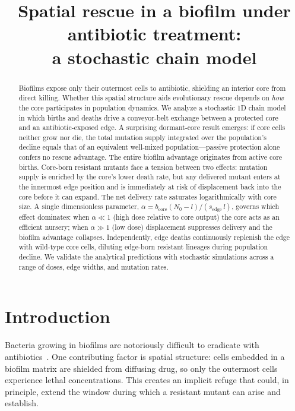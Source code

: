 \documentclass[12pt]{article}
\title{Spatial rescue in a biofilm under antibiotic treatment:\\
a stochastic chain model}
\author{}
\date{}
\begin{document}
\maketitle

\begin{abstract}
Biofilms expose only their outermost cells to antibiotic, shielding an interior
core from direct killing. Whether this spatial structure aids evolutionary
rescue depends on \emph{how} the core participates in population dynamics.
We analyze a stochastic 1D chain model in which births and deaths drive a
conveyor-belt exchange between a protected core and an antibiotic-exposed edge.
A surprising dormant-core result emerges: if core cells neither grow nor die,
the total mutation supply integrated over the population's decline equals that
of an equivalent well-mixed population---passive protection alone confers no
rescue advantage. The entire biofilm advantage originates from active core
births. Core-born resistant mutants face a tension between two effects:
mutation supply is enriched by the core's lower death rate, but any delivered
mutant enters at the innermost edge position and is immediately at risk of
displacement back into the core before it can expand. The net delivery rate
saturates logarithmically with core size. A single dimensionless parameter,
$\alpha = b_{\mathrm{core}}(N_0 - l)/(s_{\mathrm{edge}}\,l)$, governs which
effect dominates: when $\alpha \ll 1$ (high dose relative to core output) the
core acts as an efficient nursery; when $\alpha \gg 1$ (low dose) displacement
suppresses delivery and the biofilm advantage collapses. Independently, edge
deaths continuously replenish the edge with wild-type core cells, diluting
edge-born resistant lineages during population decline. We validate the
analytical predictions with stochastic simulations across a range of doses,
edge widths, and mutation rates.
\end{abstract}

\section{Introduction}
\label{sec:intro}

Bacteria growing in biofilms are notoriously difficult to eradicate with
antibiotics~\cite{costerton1999}. One contributing factor is spatial structure:
cells embedded in a biofilm matrix are shielded from diffusing drug, so only the
outermost cells experience lethal concentrations. This creates an implicit refuge
that could, in principle, extend the window during which a resistant mutant can
arise and establish.
\end{document}
